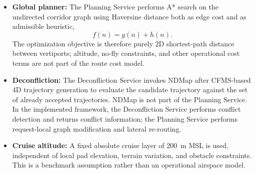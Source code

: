 \begin{itemize}
    \item \textbf{Global planner:} The Planning Service performs A* search on the undirected corridor graph using Haversine distance both as edge cost and as admissible heuristic,
    \[
        f(n) = g(n) + h(n).
    \]
    The optimization objective is therefore purely 2D shortest-path distance between vertiports; altitude, no-fly constraints, and other operational cost terms are not part of the route cost model.

    \item \textbf{Deconfliction:} The Deconfliction Service invokes NDMap after CFMS-based 4D trajectory generation to evaluate the candidate trajectory against the set of already accepted trajectories. NDMap is not part of the Planning Service. In the implemented framework, the Deconfliction Service performs conflict detection and returns conflict information; the Planning Service performs request-local graph modification and lateral re-routing.

    \item \textbf{Cruise altitude:} A fixed absolute cruise layer of \SI{200}{m} MSL is used, independent of local pad elevation, terrain variation, and obstacle constraints. This is a benchmark assumption rather than an operational airspace model.


\end{itemize}
